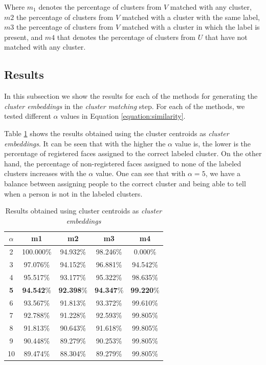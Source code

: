 Where $m_1$ denotes the percentage of clusters from $V$ matched with any cluster, $m2$ the percentage of clusters from $V$ matched with a cluster with the same label, $m3$ the percentage of clusters from $V$ matched with a cluster in which the label is present, and $m4$ that denotes the percentage of clusters from $U$ that have not matched with any cluster.

\subsection{Results}

In this subsection we show the results for each of the methods for generating the \emph{cluster embeddings} in the \emph{cluster matching} step.
For each of the methods, we tested different $\alpha$ values in Equation \ref{equation:similarity}.

Table \ref{tab:results_centroid} shows the results obtained using the cluster centroids as \emph{cluster embeddings}.
It can be seen that with the higher the $\alpha$ value is, the lower is the percentage of registered faces assigned to the correct labeled cluster.
On the other hand, the percentage of non-registered faces assigned to none of the labeled clusters increases with the $\alpha$ value.
One can see that with $\alpha = 5$, we have a balance between assigning people to the correct cluster and being able to tell when a person is not in the labeled clusters.

\begin{table}[!ht]
\centering
\small
\caption{Results obtained using cluster centroids as \emph{cluster embeddings}}
\label{tab:results_centroid}
\begin{tabular}{ccccc}
\hline
\textbf{$\alpha$} & \textbf{m1} & \textbf{m2} & \textbf{m3} & \textbf{m4} \\ \hline
2 & 100.000\% & 94.932\% & 98.246\% & 0.000\% \\
3 & 97.076\% & 94.152\% & 96.881\% & 94.542\% \\
4 & 95.517\% & 93.177\% & 95.322\% & 98.635\% \\
\textbf{5} & \textbf{94.542}\% & \textbf{92.398}\% & \textbf{94.347}\% & \textbf{99.220}\% \\
6 & 93.567\% & 91.813\% & 93.372\% & 99.610\% \\
7 & 92.788\% & 91.228\% & 92.593\% & 99.805\% \\
8 & 91.813\% & 90.643\% & 91.618\% & 99.805\% \\
9 & 90.448\% & 89.279\% & 90.253\% & 99.805\% \\
10 & 89.474\% & 88.304\% & 89.279\% & 99.805\%
\end{tabular}
\end{table}

